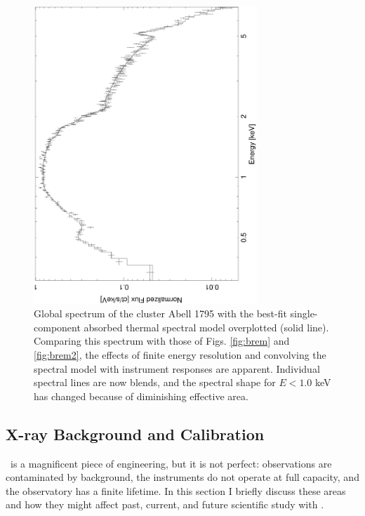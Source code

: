 \begin{figure}[!hp]
  \begin{center}
    \includegraphics*[width=0.75\textwidth, trim=0mm 0mm 0mm 0mm,angle=270,clip]{acisspec}
    \caption[Spectrum of Abell 1795.]{Global spectrum of the cluster
      Abell 1795 with the best-fit single-component absorbed thermal
      spectral model overplotted (solid line). Comparing this spectrum
      with those of Figs. \ref{fig:brem} and \ref{fig:brem2}, the
      effects of finite energy resolution and convolving the spectral
      model with instrument responses are apparent. Individual
      spectral lines are now blends, and the spectral shape for $E <
      1.0$ keV has changed because of diminishing effective area.}
    \label{fig:acisspec}
  \end{center}
\end{figure}
\clearpage

\subsection{X-ray Background and Calibration}
\label{sec:cali}

\chandra\ is a magnificent piece of engineering, but it is not
perfect: observations are contaminated by background, the instruments
do not operate at full capacity, and the observatory has a finite
lifetime. In this section I briefly discuss these areas and how they
might affect past, current, and future scientific study with \chandra.

